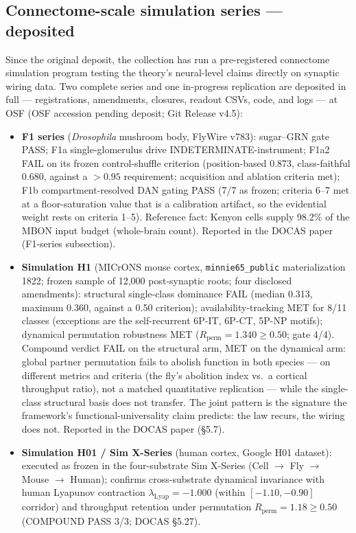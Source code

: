 \documentclass[11pt]{article}
\begin{document}
\subsection*{Connectome-scale simulation series --- deposited}

Since the original deposit, the collection has run a pre-registered
connectome simulation program testing the theory's neural-level claims
directly on synaptic wiring data. Two complete series and one in-progress
replication are deposited in full --- registrations, amendments, closures,
readout CSVs, code, and logs --- at OSF (OSF accession pending deposit; Git Release v4.5):

\begin{itemize}
\item \textbf{F1 series} (\emph{Drosophila} mushroom body, FlyWire v783):
sugar--GRN gate PASS; F1a single-glomerulus drive INDETERMINATE-instrument;
F1a2 FAIL on its frozen control-shuffle criterion (position-based 0.873,
class-faithful 0.680, against a $>0.95$ requirement; acquisition and
ablation criteria met); F1b compartment-resolved DAN gating PASS (7/7 as
frozen; criteria 6--7 met at a floor-saturation value that is a calibration
artifact, so the evidential weight rests on criteria 1--5).
Reference fact: Kenyon cells supply 98.2\% of the MBON input budget
(whole-brain count). Reported in the DOCAS paper (F1-series subsection).
\item \textbf{Simulation H1} (MICrONS mouse cortex, \texttt{minnie65\_public}
materialization 1822; frozen sample of 12{,}000 post-synaptic roots; four
disclosed amendments): structural single-class dominance FAIL (median 0.313,
maximum 0.360, against a 0.50 criterion); availability-tracking MET for
8/11 classes (exceptions are the self-recurrent 6P-IT, 6P-CT, 5P-NP motifs);
dynamical permutation robustness MET ($R_{\mathrm{perm}} = 1.340 \geq 0.50$;
gate 4/4). Compound verdict FAIL on the structural arm, MET on the dynamical arm:
global partner permutation fails to abolish function in both species ---
on different metrics and criteria (the fly's abolition index vs.\ a
cortical throughput ratio), not a matched quantitative replication ---
while the single-class structural basis does not transfer. The joint
pattern is the signature the framework's functional-universality claim
predicts: the law recurs, the wiring does not. Reported in the DOCAS
paper (\S{}5.7).
\item \textbf{Simulation H01 / Sim X-Series} (human cortex, Google H01 dataset): executed as frozen in the four-substrate Sim X-Series (Cell $\to$ Fly $\to$ Mouse $\to$ Human); confirms cross-substrate dynamical invariance with human Lyapunov contraction $\lambda_{\mathrm{Lyap}} = -1.000$ (within $[-1.10, -0.90]$ corridor) and throughput retention under permutation $R_{\mathrm{perm}} = 1.18 \ge 0.50$ (COMPOUND PASS 3/3; DOCAS \S{}5.27).
\end{itemize}
\end{document}
